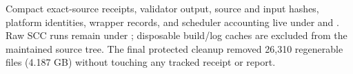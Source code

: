\documentclass[10pt]{article}
\begin{document}
Compact exact-source receipts, validator output, source and input hashes,
platform identities, wrapper records, and scheduler accounting live under
 and
. Raw SCC runs remain under
; disposable build/log caches are excluded
from the maintained source tree. The final protected cleanup removed 26,310
regenerable files (4.187 GB) without touching any tracked receipt or report.
\end{document}

